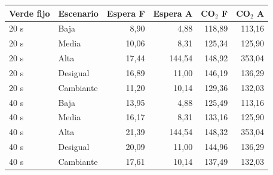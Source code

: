 \begin{tabular}{llrrrr}\toprule
Verde fijo & Escenario & Espera F & Espera A & CO$_2$ F & CO$_2$ A\\\midrule
20 s & Baja & 8,90 & 4,88 & 118,89 & 113,16\\
20 s & Media & 10,06 & 8,31 & 125,34 & 125,90\\
20 s & Alta & 17,44 & 144,54 & 148,92 & 353,04\\
20 s & Desigual & 16,89 & 11,00 & 146,19 & 136,29\\
20 s & Cambiante & 11,20 & 10,14 & 129,36 & 132,03\\
40 s & Baja & 13,95 & 4,88 & 125,49 & 113,16\\
40 s & Media & 16,17 & 8,31 & 133,16 & 125,90\\
40 s & Alta & 21,39 & 144,54 & 148,32 & 353,04\\
40 s & Desigual & 20,09 & 11,00 & 144,96 & 136,29\\
40 s & Cambiante & 17,61 & 10,14 & 137,49 & 132,03\\
\bottomrule\end{tabular}

